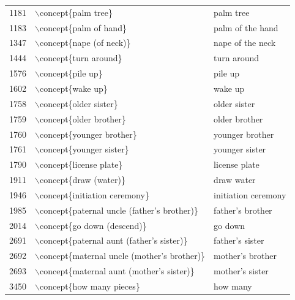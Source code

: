 \begin{table}[ht]
\begin{tabular}{rll}
  1181 & $\backslash$concept\{palm tree\} & palm tree \\ 
  1183 & $\backslash$concept\{palm of hand\} & palm of the hand \\ 
  1347 & $\backslash$concept\{nape (of neck)\} & nape of the neck \\ 
  1444 & $\backslash$concept\{turn around\} & turn around \\ 
  1576 & $\backslash$concept\{pile up\} & pile up \\ 
  1602 & $\backslash$concept\{wake up\} & wake up \\ 
  1758 & $\backslash$concept\{older sister\} & older sister \\ 
  1759 & $\backslash$concept\{older brother\} & older brother \\ 
  1760 & $\backslash$concept\{younger brother\} & younger brother \\ 
  1761 & $\backslash$concept\{younger sister\} & younger sister \\ 
  1790 & $\backslash$concept\{license plate\} & license plate \\ 
  1911 & $\backslash$concept\{draw (water)\} & draw water \\ 
  1946 & $\backslash$concept\{initiation ceremony\} & initiation ceremony \\ 
  1985 & $\backslash$concept\{paternal uncle (father's brother)\} & father's brother \\ 
  2014 & $\backslash$concept\{go down (descend)\} & go down \\ 
  2691 & $\backslash$concept\{paternal aunt (father's sister)\} & father's sister \\ 
  2692 & $\backslash$concept\{maternal uncle (mother's brother)\} & mother's brother \\ 
  2693 & $\backslash$concept\{maternal aunt (mother's sister)\} & mother's sister \\ 
  3450 & $\backslash$concept\{how many pieces\} & how many \\ 
   \hline
\end{tabular}
\end{table}
